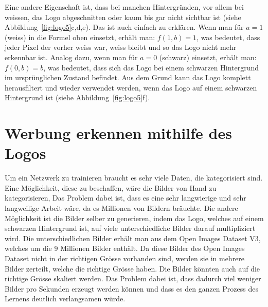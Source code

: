 \documentclass[12pt,a4paper]{report}
\begin{document}
Eine andere Eigenschaft ist, dass bei manchen Hintergründen,
vor allem bei weissen, das Logo abgeschnitten oder kaum bis gar nicht sichtbar ist (siehe Abbildung~\ref{fig:logo5}c,d,e).
Das ist auch einfach zu erklären.
Wenn man für $a = 1$ (weiss) in die Formel oben einsetzt, erhält man: $f(1, b) = 1$,
was bedeutet, dass jeder Pixel der vorher weiss war, weiss bleibt und so das Logo nicht mehr erkennbar ist.
Analog dazu, wenn man für $a = 0$ (schwarz) einsetzt, erhält man: $f(0, b) = b$, was bedeutet, dass sich das Logo bei einem schwarzen Hintergrund
im ursprünglichen Zustand befindet.
Aus dem Grund kann das Logo komplett herausfiltert und wieder verwendet werden, wenn das Logo auf einem schwarzen Hintergrund ist (siehe Abbildung~\ref{fig:logo5}f).

\section{Werbung erkennen mithilfe des Logos}
Um ein Netzwerk zu trainieren braucht es sehr viele Daten, die kategorisiert sind.
Eine Möglichkeit, diese zu beschaffen, wäre die Bilder von Hand zu kategorisieren,
Das Problem dabei ist, dass es eine sehr langwierige und sehr langweilige Arbeit wäre,
da es Millionen von Bildern bräuchte.
Die andere Möglichkeit ist die Bilder selber zu generieren,
indem das Logo, welches auf einem schwarzen Hintergrund ist, auf viele unterschiedliche Bilder darauf multipliziert wird.
Die unterschiedlichen Bilder erhält man aus dem Open Images Dataset V3\cite{openimages}, welches um die 9 Millionen Bilder enthält.
Da diese Bilder des Open Images Dataset nicht in der richtigen Grösse vorhanden sind, werden sie in mehrere Bilder zerteilt, welche die richtige Grösse haben.
Die Bilder könnten auch auf die richtige Grösse skaliert werden.
Das Problem dabei ist, dass dadurch viel weniger Bilder pro Sekunden erzeugt werden können und dass es den ganzen Prozess des Lernens deutlich verlangsamen würde.
\end{document}
